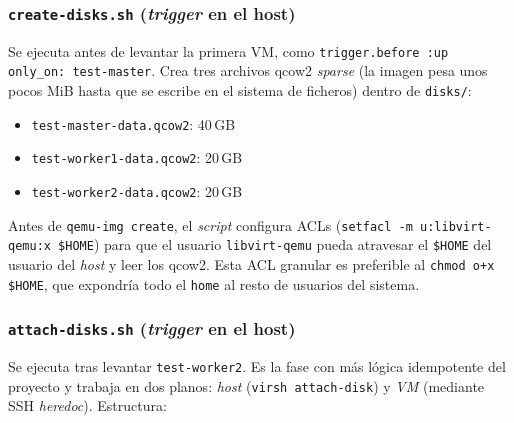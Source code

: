 \subsubsection{\texttt{create-disks.sh} (\emph{trigger} en el host)}

Se ejecuta antes de levantar la primera VM, como \texttt{trigger.before :up only\_on: test-master}. Crea tres archivos qcow2 \emph{sparse} (la imagen pesa unos pocos MiB hasta que se escribe en el sistema de ficheros) dentro de \texttt{disks/}:

\begin{itemize}
  \item \texttt{test-master-data.qcow2}: 40\,GB
  \item \texttt{test-worker1-data.qcow2}: 20\,GB
  \item \texttt{test-worker2-data.qcow2}: 20\,GB
\end{itemize}

Antes de \texttt{qemu-img create}, el \emph{script} configura ACLs (\texttt{setfacl -m u:libvirt-qemu:x \$HOME}) para que el usuario \texttt{libvirt-qemu} pueda atravesar el \texttt{\$HOME} del usuario del \emph{host} y leer los qcow2. Esta ACL granular es preferible al \texttt{chmod o+x \$HOME}, que expondría todo el \texttt{home} al resto de usuarios del sistema.

\subsubsection{\texttt{attach-disks.sh} (\emph{trigger} en el host)}

Se ejecuta tras levantar \texttt{test-worker2}. Es la fase con más lógica idempotente del proyecto y trabaja en dos planos: \emph{host} (\texttt{virsh attach-disk}) y \emph{VM} (mediante SSH \emph{heredoc}). Estructura:

